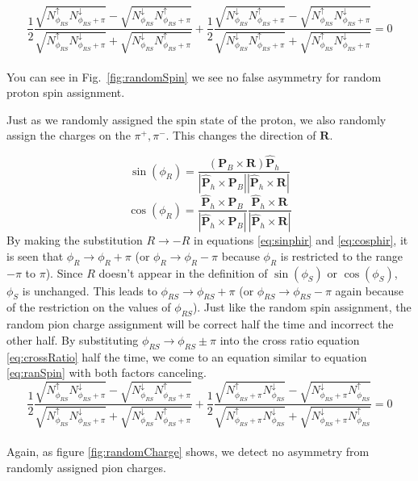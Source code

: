 \documentclass[letterpaper, abstract = on,listof=totoc, bibliography=totoc]{scrreprt}
\newcommand{\phirs}{\phi_{RS}}
\newcommand{\pip}{\pi^+}
\newcommand{\pim}{\pi^-}
\begin{document}
    

 
\begin{equation}
\label{eq:ranSpin}
\frac{1}{2}\frac{\sqrt{N^\uparrow_{\phi_{RS}}N^\downarrow_{\phi_{RS}+\pi}} - \sqrt{N^\downarrow_{\phi_{RS}}N^\uparrow_{\phi_{RS}+\pi}}}{\sqrt{N^\uparrow_{\phi_{RS}}N^\downarrow_{\phi_{RS}+\pi}} + \sqrt{N^\downarrow_{\phi_{RS}}N^\uparrow_{\phi_{RS}+\pi}}}
+
\frac{1}{2}\frac{\sqrt{N^\downarrow_{\phi_{RS}}N^\uparrow_{\phi_{RS}+\pi}} - \sqrt{N^\uparrow_{\phi_{RS}}N^\downarrow_{\phi_{RS}+\pi}}}{\sqrt{N^\downarrow_{\phi_{RS}}N^\uparrow_{\phi_{RS}+\pi}} + \sqrt{N^\uparrow_{\phi_{RS}}N^\downarrow_{\phi_{RS}+\pi}}} = 0
\end{equation}\\
%
You can see in Fig.~\ref{fig:randomSpin} we see no false asymmetry for random proton spin assignment. 

Just as we randomly assigned the spin state of the proton, we also randomly assign the charges on the $\pip,\pim$. This changes the direction of $\bm{R}$. 

\begin{equation}
\label{eq:sinphir}
\sin(\phi_R) = \frac{(\bm{P}_B \times \bm{R})  \bm{\hat{P}}_h}{|\bm{\hat{P}}_h \times \bm{P}_B||\bm{\hat{P}}_h \times \bm{R}|}
\end{equation}
\begin{equation}
\label{eq:cosphir}
\cos(\phi_R) = \frac{\bm{\hat{P}}_h \times \bm{P}_B}{|\bm{\hat{P}}_h \times \bm{P}_B|}  \frac{\bm{\hat{P}}_h\times \bm{R}}{|\bm{\hat{P}}_h\times \bm{R}|}
\end{equation}
%
By making the substitution $R\rightarrow -R$ in equations \ref{eq:sinphir} and \ref{eq:cosphir}, it is seen that $\phi_R \rightarrow \phi_R + \pi$ (or $\phi_R \rightarrow \phi_R - \pi$ because $\phi_R$ is restricted to the range $-\pi$ to  $\pi$). Since $R$ doesn't appear in the definition of $\sin(\phi_S)$ or $\cos(\phi_S)$, $\phi_S$ is unchanged. This leads to $\phirs \rightarrow \phirs + \pi$ (or $\phirs \rightarrow \phirs - \pi$ again because of the restriction on the values of $\phirs$). Just like the random spin assignment, the random pion charge assignment will be correct half the time and incorrect the other half. By substituting $\phirs \rightarrow \phirs \pm \pi$ into the cross ratio equation \ref{eq:crossRatio} half the time, we come to an equation similar to equation \ref{eq:ranSpin} with both factors canceling.
\begin{equation}
\label{eq:ranCharge}
\frac{1}{2}\frac{\sqrt{N^\uparrow_{\phi_{RS}}N^\downarrow_{\phi_{RS}+\pi}} - \sqrt{N^\downarrow_{\phi_{RS}}N^\uparrow_{\phi_{RS}+\pi}}}{\sqrt{N^\uparrow_{\phi_{RS}}N^\downarrow_{\phi_{RS}+\pi}} + \sqrt{N^\downarrow_{\phi_{RS}}N^\uparrow_{\phi_{RS}+\pi}}}
+
\frac{1}{2}\frac{\sqrt{N^\uparrow_{\phi_{RS}+\pi}N^\downarrow_{\phi_{RS}}} - \sqrt{N^\downarrow_{\phi_{RS}+\pi}N^\uparrow_{\phi_{RS}}}}{\sqrt{N^\uparrow_{\phi_{RS}+\pi}N^\downarrow_{\phi_{RS}}} + \sqrt{N^\downarrow_{\phi_{RS}+\pi}N^\uparrow_{\phi_{RS}}}} = 0
\end{equation}\\
Again, as figure \ref{fig:randomCharge} shows, we detect no asymmetry from randomly assigned pion charges.
\end{document}
